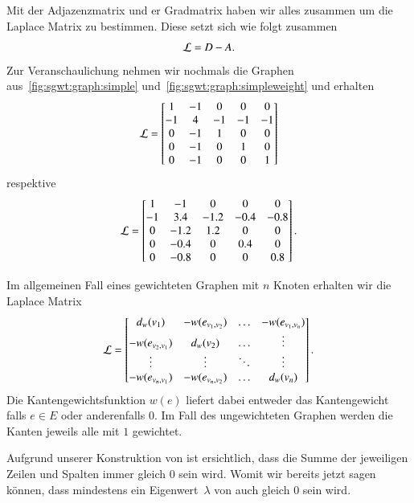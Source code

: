 Mit der Adjazenzmatrix und er Gradmatrix haben wir alles zusammen um die 
Laplace Matrix \laplaceL{} zu bestimmen. Diese setzt sich wie folgt zusammen
\begin{equation}
\laplaceL = \degreeM - \adjacencyM.
\label{eq:sgwt:laplace}
\end{equation}
Zur Veranschaulichung nehmen wir nochmals die Graphen 
aus~\cref{fig:sgwt:graph:simple} und~\cref{fig:sgwt:graph:simpleweight} und 
erhalten
\begin{equation*}
\laplaceL =
\begin{bmatrix}
1 & -1 & 0 & 0 & 0 \\
-1 & 4 & -1 & -1 & -1 \\
0 & -1 & 1 & 0 & 0 \\
0 & -1 & 0 & 1 & 0 \\
0 & -1 & 0 & 0 & 1
\end{bmatrix}
\end{equation*}
respektive
\begin{equation*}
\laplaceL =
\begin{bmatrix}
1 & -1 & 0 & 0 & 0 \\
-1 & 3.4 & -1.2 & -0.4 & -0.8 \\
0 & -1.2 & 1.2 & 0 & 0 \\
0 & -0.4 & 0 & 0.4 & 0 \\
0 & -0.8 & 0 & 0 & 0.8
\end{bmatrix}.
\end{equation*}

Im allgemeinen Fall eines gewichteten Graphen mit $n$ Knoten erhalten wir die 
Laplace Matrix
\begin{equation*}
\laplaceL =
\begin{bmatrix}
d_w(v_1) & -w(e_{v_1, v_2}) & \dotso & -w(e_{v_1, v_n}) \\
-w(e_{v_2, v_1}) & d_w(v_2) & \dotso & \vdots \\
\vdots & \vdots & \ddots &  \vdots \\
-w(e_{v_n, v_1}) & -w(e_{v_n, v_2}) & \dotso & d_w(v_n)
\end{bmatrix}.
\end{equation*}
Die Kantengewichtsfunktion $w(e)$ liefert dabei entweder das Kantengewicht 
falls $e \in E$ oder anderenfalls $0$. Im Fall des ungewichteten Graphen werden 
die Kanten jeweils alle mit $1$ gewichtet.

Aufgrund unserer Konstruktion von \laplaceL{} ist ersichtlich, dass die Summe 
der jeweiligen Zeilen und Spalten immer gleich $0$ sein wird. Womit wir bereits 
jetzt sagen k\"onnen, dass mindestens ein Eigenwert~$\lambda$ von \laplaceL{} 
auch gleich $0$ sein wird.

